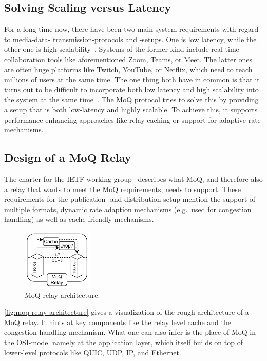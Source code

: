 \subsection{Solving Scaling versus Latency}
For a long time now, there have been two main system requirements with regard to media-data-
transmission-protocols and -setups.
One is low latency, while the other one is high scalability~\parencite{what-is-moq}.
Systems of the former kind include real-time collaboration tools like aforementioned Zoom, Teams, or Meet.
The latter ones are often huge platforms like Twitch, YouTube, or Netflix, which need to 
reach millions of users at the same time.
The one thing both have in common is that it turns out to be difficult to incorporate both 
low latency and high scalability into the system at the same time~\parencite{what-is-moq}.
The MoQ protocol tries to solve this by providing a setup that is both low-latency and
highly scalable.
To achieve this, it supports performance-enhancing approaches like relay caching or support 
for adaptive rate mechanisms. %

\subsection{Design of a MoQ Relay}
The charter for the IETF working group~\parencite{moq-charter} describes what MoQ, and therefore also a relay 
that wants to meet the MoQ requirements, needs to support.
These requirements for the publication- and distribution-setup mention the support of 
multiple formats, dynamic rate adaption mechanisms (e.g.~used for congestion handling)
as well as cache-friendly mechanisms.

\begin{figure}[H]
    \centering
    \includegraphics[width=0.3\textwidth]{figures/02_background/moq-relay.drawio.pdf}
    \caption[MoQ relay architecture]{MoQ relay architecture.}\label{fig:moq-relay-architecture}
\end{figure}

\autoref{fig:moq-relay-architecture} gives a visualization of the rough architecture
of a MoQ relay.
It hints at key components like the relay level cache and the congestion handling
mechanism.
What one can also infer is the place of MoQ in the OSI-model namely at the application
layer, which itself builds on top of lower-level protocols like QUIC, UDP, IP, and Ethernet.

